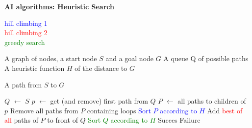 \documentclass[11pt] {article}
\newcommand{\algorithmicinput}{\textbf{Input:}}
\newcommand{\algorithmicoutput}{\textbf{Output:}}
\newcommand{\INPUT}{\item[\algorithmicinput]}
\newcommand{\OUTPUT}{\item[\algorithmicoutput]}
\newcommand{\algorithmicalgo}{\textbf{Algorithm:}}
\newcommand{\ALGO}{\item[\algorithmicalgo]}
\begin{document}
\pagestyle{empty}


\begin{center}
\LARGE
\textbf{AI algorithms: Heuristic Search}\\
\end{center}
\vspace{1cm}

\noindent \textcolor{blue}{hill climbing 1}\\
\textcolor{red}{hill climbing 2}\\
\textcolor{green}{greedy search}\\

\begin{algorithmic}
\INPUT
\STATE A graph of nodes, a start node $S$ and a goal node $G$
\STATE A queue Q of possible paths
\STATE A heuristic function $H$ of the distance to $G$

\OUTPUT 
\STATE A path from $S$ to $G$
\end{algorithmic}

\begin{algorithmic}
\ALGO
\STATE $Q$ $\leftarrow$ $S$
\STATE $p$ $\leftarrow$ get (and remove) first path from $Q$
\STATE $P$ $\leftarrow$ all paths to children of $p$
\STATE Remove all paths from $P$ containing loops
\STATE \textcolor{blue}{Sort $P$ according to $H$}
\STATE Add \textcolor{red}{best of all} paths of $P$ to front of $Q$
\STATE \textcolor{green}{Sort $Q$ according to $H$}
\ENDWHILE
{}
\STATE Succes
\ELSE
\STATE Failure
\ENDIF
\end{algorithmic}
\end{document}
